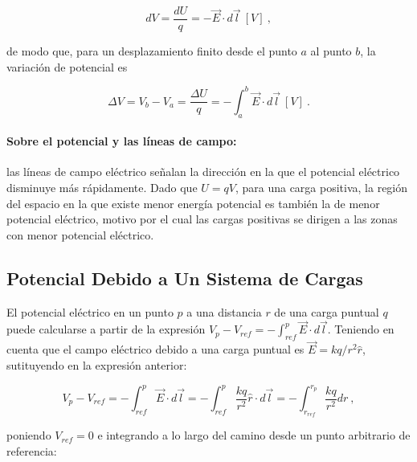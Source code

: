 \documentclass{tufte-handout}
\begin{document}


\begin{equation}
dV = \frac{dU}{q} = -\vec{E}\cdot d\vec{l}~[V]~,
\end{equation}

de modo que, para un desplazamiento finito desde el punto $a$ al punto $b$, la variación de potencial es

\begin{equation}
\Delta V = V_b - V_a = \frac{\Delta U}{q} = -\int_a^b \vec{E}\cdot d\vec{l}~[V]~.
\end{equation}

\paragraph{Sobre el potencial y las líneas de campo:} las líneas de campo eléctrico señalan la dirección en la que el potencial eléctrico disminuye más rápidamente. Dado que $U = qV$, para una carga positiva, la región del espacio en la que existe menor energía potencial es también la de menor potencial eléctrico, motivo por el cual las cargas positivas se dirigen a las zonas con menor potencial eléctrico.

\subsection{Potencial Debido a Un Sistema de Cargas}

El potencial eléctrico en un punto $p$ a una distancia $r$ de una carga puntual $q$ puede calcularse a partir de la expresión $V_p - V_{ref} = -\int_{ref}^p \vec{E}\cdot d\vec{l}$. Teniendo en cuenta que el campo eléctrico debido a una carga puntual es $\vec{E} = kq/r^2 \hat{r}$, sutituyendo en la expresión anterior:

\begin{equation}
V_p - V_{ref} = -\int_{ref}^p \vec{E}\cdot d\vec{l} = -\int_{ref}^p \frac{kq}{r^2}\hat{r}\cdot d\vec{l} = -\int_{r_{ref}}^{r_p}\frac{kq}{r^2}dr~,
\end{equation}

poniendo $V_{ref} = 0$ e integrando a lo largo del camino desde un punto arbitrario de referencia:
\end{document}

